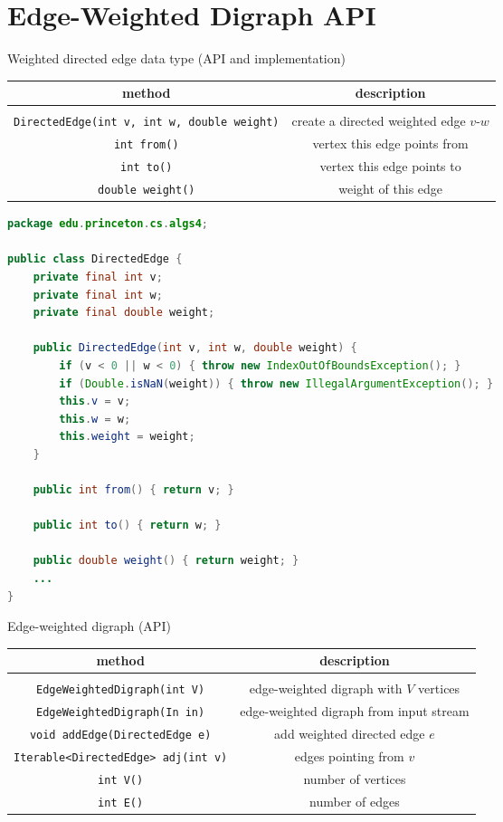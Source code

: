 \documentclass[8pt,a4paper,compress]{beamer}
\begin{document}
\section{Edge-Weighted Digraph API}
\begin{frame}[fragile]
Weighted directed edge data type (API and implementation)
\begin{center}
\begin{tabular}{cc}
method & description \\ \hline \\
\lstinline$DirectedEdge(int v, int w, double weight)$ & create a directed weighted edge $v$-$w$ \\
\lstinline$int from()$ & vertex this edge points from \\
\lstinline$int to()$ & vertex this edge points to \\
\lstinline$double weight()$ & weight of this edge
\end{tabular}  
\end{center}

\begin{lstlisting}[language=Java]
package edu.princeton.cs.algs4;

public class DirectedEdge { 
    private final int v;
    private final int w;
    private final double weight;
    
    public DirectedEdge(int v, int w, double weight) {
        if (v < 0 || w < 0) { throw new IndexOutOfBoundsException(); }
        if (Double.isNaN(weight)) { throw new IllegalArgumentException(); }
        this.v = v;
        this.w = w;
        this.weight = weight;
    }

    public int from() { return v; }

    public int to() { return w; }

    public double weight() { return weight; }
    ...
}
\end{lstlisting}
\end{frame}

\begin{frame}[fragile]
Edge-weighted digraph (API)
\begin{center}
\begin{tabular}{cc}
method & description \\ \hline \\
\lstinline$EdgeWeightedDigraph(int V)$ & edge-weighted digraph with $V$ vertices \\
\lstinline$EdgeWeightedDigraph(In in)$ & edge-weighted digraph from input stream \\
\lstinline$void addEdge(DirectedEdge e)$ & add weighted directed edge $e$ \\
\lstinline$Iterable<DirectedEdge> adj(int v)$ & edges pointing from $v$ \\
\lstinline$int V()$ & number of vertices \\
\lstinline$int E()$ & number of edges \\
\end{tabular}  
\end{center}
\end{frame}
\end{document}
